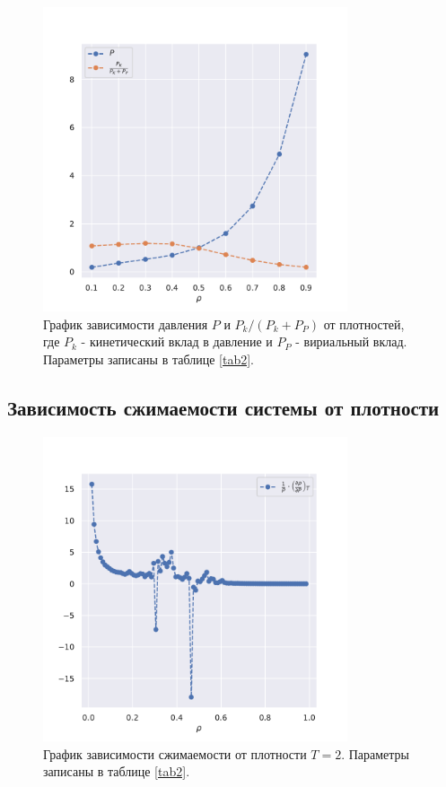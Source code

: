 \documentclass[a4paper,12pt]{article}
\begin{document}
\begin{figure}[H]
    \centering
    \includegraphics[width=0.8\textwidth]{../../media/pressure.pdf}
\caption{График зависимости давления \(P\) и \(P_k / (P_k + P_P)\) от плотностей, где \(P_k\) - кинетический вклад в давление и \(P_P\) - вириальный вклад. Параметры записаны в таблице \ref{tab2}.}
    \label{fig-eos}
\end{figure}

\subsection{Зависимость сжимаемости системы от плотности}

\begin{figure}[H]
    \centering
    \includegraphics[width=0.8\textwidth]{../../media/compr.pdf}
    \caption{График зависимости сжимаемости от плотности
    \(T = 2\). Параметры записаны в таблице \ref{tab2}.}
    \label{fig-compr}
\end{figure}
\end{document}
